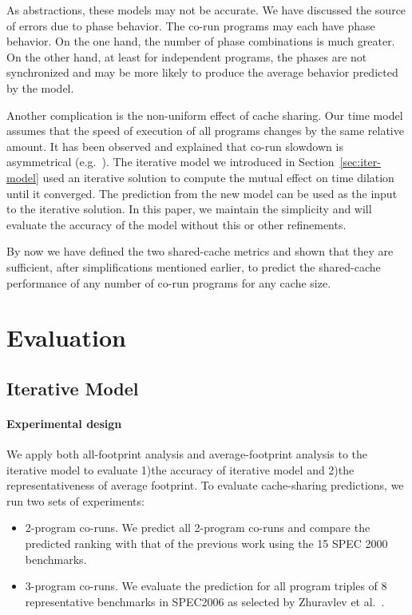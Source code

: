 As abstractions, these models may not be accurate.  We have discussed
the source of errors due to phase behavior.  The co-run programs may
each have phase behavior.  On the one hand, the number of phase
combinations is much greater.  On the other hand, at least for
independent programs, the phases are not synchronized and may be more
likely to produce the average behavior predicted by the model.

Another complication is the non-uniform effect of cache sharing.  Our
time model assumes that the speed of execution of all programs changes
by the same relative amount.  It has been observed and explained that
co-run slowdown is asymmetrical (e.g.~\cite{Zhang+:EuroSys09}).  The
iterative model we introduced in Section~\ref{sec:iter-model} used an
iterative solution to compute the mutual effect on time dilation until
it converged. The prediction from the new model can be used as the
input to the iterative solution.  In this paper, we maintain the
simplicity and will evaluate the accuracy of the model without this or
other refinements.

By now we have defined the two shared-cache metrics and shown that
they are sufficient, after simplifications mentioned earlier, to predict
the shared-cache performance of any number of co-run programs for any
cache size.

\section{Evaluation}

\subsection{Iterative Model}
\label{sec:iter-rank}
\paragraph{Experimental design}
We apply both all-footprint analysis and average-footprint analysis to
the iterative model to evaluate 1)the accuracy of iterative model and
2)the representativeness of average footprint. To evaluate
cache-sharing predictions, we run two sets of experiments:  

\begin{itemize}
\item 2-program co-runs. We predict all 2-program co-runs and compare
  the predicted ranking with that of the previous work using the 15 SPEC
  2000 benchmarks.

\item 3-program co-runs. We evaluate the prediction for all
  program triples of 8 representative benchmarks in SPEC2006 as
  selected by Zhuravlev et al.~\cite{Zhuravlev+:ASPLOS10}.
\end{itemize}


